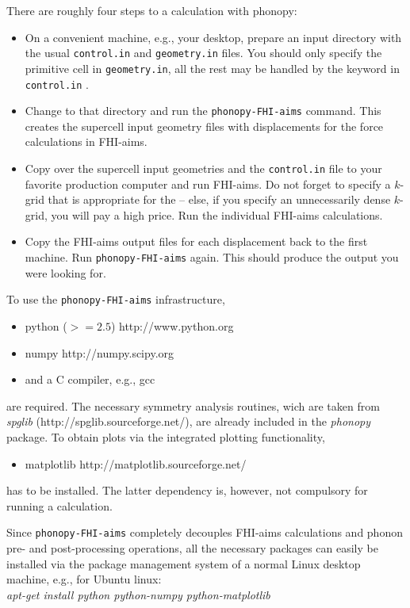 There are roughly four steps to a calculation with phonopy:
\begin{itemize}
  \item On a convenient machine, e.g., your desktop, prepare an input
    directory with the usual \texttt{control.in} and
    \texttt{geometry.in} files. You should only specify the primitive
    cell in \texttt{geometry.in}, all the rest may be handled by the
     keyword in \texttt{control.in} .
  \item Change to that directory and run the \texttt{phonopy-FHI-aims}
    command. This creates the supercell input geometry files with
    displacements for the force calculations in FHI-aims.
  \item Copy over the supercell input geometries and the
    \texttt{control.in} file to your favorite production computer and
    run FHI-aims. Do not forget to specify a $k$-grid that is
    appropriate for the  -- else, if you specify an
    unnecessarily dense $k$-grid, you will pay a high price. Run the
    individual FHI-aims calculations.
  \item Copy the FHI-aims output files for each displacement back to
    the first machine. Run \texttt{phonopy-FHI-aims} again. This
    should produce the output you were looking for.
\end{itemize}

To use the \texttt{phonopy-FHI-aims} infrastructure,
\begin{itemize}
\item[] python ($>=2.5$) http://www.python.org
\item[] numpy http://numpy.scipy.org
\item[] and a C compiler, e.g., gcc 
\end{itemize}
are required. The necessary symmetry analysis routines, wich are
taken from {\it spglib} (http://spglib.sourceforge.net/), are already
included in the {\it phonopy} package. To obtain plots via the integrated 
plotting functionality,
\begin{itemize}
\item[] matplotlib http://matplotlib.sourceforge.net/
\end{itemize}
has to be installed. The latter dependency is, however, not compulsory
for running a calculation. 

Since \texttt{phonopy-FHI-aims} completely decouples FHI-aims
calculations and phonon pre- and post-processing operations, all the
necessary packages can easily be installed via the package management
system of a normal Linux desktop machine, e.g., for Ubuntu linux:\\  
{\it apt-get install python python-numpy python-matplotlib}

